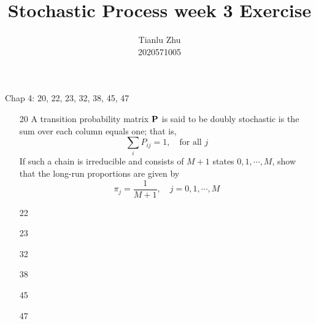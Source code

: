 \documentclass[en,hazy,blue,12pt,device = pad]{elegantnote}
\title{Stochastic Process week 3 Exercise}
\author{Tianlu Zhu \\ 2020571005}
\date{}
\begin{document}
\maketitle

Chap 4: 20, 22, 23, 32, 38, 45, 47

\begin{enumerate}
    \item[20] A transition probability matrix \({\bf P}\) is said to be doubly stochastic is the sum over each column equals one; that is,
    \[\sum _i P_{ij } = 1, \quad \text{for all } j  \] 
    If such a chain is irreducible and consists of \(M+1\) states \(0,1,\cdots,M\), show that the long-run proportions are given by 
    \[\pi_j = \frac{1}{M+1},\quad j = 0,1,\cdots,M\]
    \begin{tcolorbox}
        \sol 

        
    \end{tcolorbox}
    \item[22]
    \item[23]
    \item[32] 
    \item[38] 
    \item[45] 
    \item[47]  
\end{enumerate}
\end{document}
